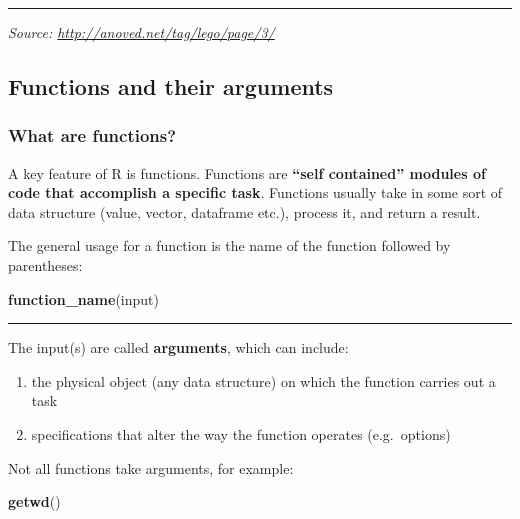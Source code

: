 \documentclass[
]{article}
\newenvironment{Shaded}{\begin{snugshade}}{\end{snugshade}}
\newcommand{\KeywordTok}[1]{\textcolor[rgb]{0.13,0.29,0.53}{\textbf{#1}}}
\newcommand{\NormalTok}[1]{#1}
\providecommand{\tightlist}{%
  \setlength{\itemsep}{0pt}\setlength{\parskip}{0pt}}
\begin{document}
\begin{center}\rule{0.5\linewidth}{0.5pt}\end{center}

\emph{Source: \url{http://anoved.net/tag/lego/page/3/}}

\hypertarget{functions-and-their-arguments}{%
\subsection{Functions and their
arguments}\label{functions-and-their-arguments}}

\hypertarget{what-are-functions}{%
\subsubsection{What are functions?}\label{what-are-functions}}

A key feature of R is functions. Functions are \textbf{``self
contained'' modules of code that accomplish a specific task}. Functions
usually take in some sort of data structure (value, vector, dataframe
etc.), process it, and return a result.

The general usage for a function is the name of the function followed by
parentheses:

\begin{Shaded}
\begin{Highlighting}[]
\KeywordTok{function_name}\NormalTok{(input)}
\end{Highlighting}
\end{Shaded}

\begin{center}\rule{0.5\linewidth}{0.5pt}\end{center}

The input(s) are called \textbf{arguments}, which can include:

\begin{enumerate}
\def\labelenumi{\arabic{enumi}.}
\tightlist
\item
  the physical object (any data structure) on which the function carries
  out a task
\item
  specifications that alter the way the function operates (e.g.~options)
\end{enumerate}

Not all functions take arguments, for example:

\begin{Shaded}
\begin{Highlighting}[]
\KeywordTok{getwd}\NormalTok{()}
\end{Highlighting}
\end{Shaded}
\end{document}
